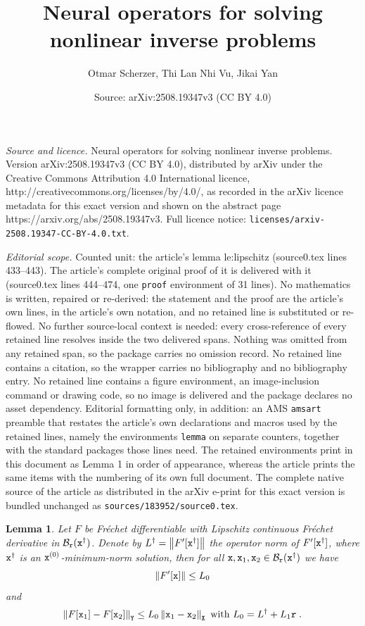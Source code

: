 \documentclass[10pt,a4paper]{amsart}
\title{Neural operators for solving nonlinear inverse problems}
\author{Otmar Scherzer, Thi Lan Nhi Vu, Jikai Yan}
\date{Source: arXiv:2508.19347v3 (CC BY 4.0)}
\newtheorem{lemma}{Lemma}
\newcommand{\X}{{\tt X}}
\newcommand{\Y}{{\tt Y}}
\newcommand{\norm}[1]{\left\|#1\right\|}
\newcommand{\x}{{\tt x}}
\newcommand{\xdag}{\x^\dagger}
\begin{document}
\maketitle

\noindent\emph{Source and licence.} Neural operators for solving nonlinear inverse problems. Version arXiv:2508.19347v3 (CC BY 4.0), distributed by arXiv under the Creative Commons Attribution 4.0 International licence, http://creativecommons.org/licenses/by/4.0/, as recorded in the arXiv licence metadata for this exact version and shown on the abstract page https://arxiv.org/abs/2508.19347v3. Full licence notice: \texttt{licenses/arxiv-2508.19347-CC-BY-4.0.txt}.\par\smallskip

\noindent\textit{Editorial scope.} Counted unit: the article's lemma le:lipschitz (source0.tex lines 433--443). The article's complete original proof of it is delivered with it (source0.tex lines 444--474, one \texttt{proof} environment of 31 lines). No mathematics is written, repaired or re-derived: the statement and the proof are the article's own lines, in the article's own notation, and no retained line is substituted or re-flowed.  No further source-local context is needed: every cross-reference of every retained line resolves inside the two delivered spans.  Nothing was omitted from any retained span, so the package carries no omission record.  No retained line contains a citation, so the wrapper carries no bibliography and no bibliography entry.  No retained line contains a figure environment, an image-inclusion command or drawing code, so no image is delivered and the package declares no asset dependency.  Editorial formatting only, in addition: an AMS \texttt{amsart} preamble that restates the article's own declarations and macros used by the retained lines, namely the environments \texttt{lemma} on separate counters, together with the standard packages those lines need.  The retained environments print in this document as Lemma 1 in order of appearance, whereas the article prints the same items with the numbering of its own full document.  The complete native source of the article as distributed in the arXiv e-print for this exact version is bundled unchanged as \texttt{sources/183952/source0.tex}.
\begin{lemma} \label{le:lipschitz}
	Let $F$ be Fr\'echet differentiable with Lipschitz continuous Fr\'echet derivative in $\mathcal{B}_{\tt r}(\xdag)$.
	Denote by $L^\dagger = \norm{F'[\xdag]}$ the operator norm of $F'[\xdag]$, where $\xdag$ is an $\x^{(0)}$-minimum-norm solution, then for all $\x,\x_1,\x_2 \in \mathcal{B}_{\tt r}(\xdag)$ we have
	\begin{equation} \label{eq:norm}
		\norm{F'[\x]} \leq L_0
	\end{equation}
	and
	\begin{equation} \label{eq:lipschitz0}
		\norm{F[\x_1]-F[\x_2]}_\Y \leq L_0 \norm{\x_1-\x_2}_\X \text{ with } L_0=L^\dagger + L_1{\tt r}\;.
	\end{equation}
\end{lemma}
\end{document}
